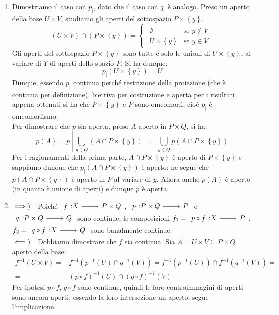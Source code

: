 \begin{demonstration}
\begin{enumerate}[label=\Roman*]
\begin{enumerate}[label=\alph*)]
\end{enumerate}
\item Dimostriamo il caso con $p_{\mid}$, dato che il caso con $q_{\mid}$ è analogo. Preso un aperto della base $U\times V$, studiamo gli aperti del sottospazio $P\times\left\{ y\right\}$.
\begin{equation*}
\left(U\times V\right)\cap \left(P\times\left\{ y\right\}\right)=\begin{cases}
	\begin{array}{ll}
		\emptyset & \text{se }y\notin V\\
		U\times\left\{y\right\} &\text{se }y\in V
	\end{array}
\end{cases}
\end{equation*}
Gli aperti del sottospazio $P\times\left\{ y\right\}$ sono tutte e solo le unioni di $U\times\left\{ y\right\}$, al variare di $Y$ di aperti dello spazio $P$. Si ha dunque:
\begin{equation*}
p_{\mid}\left(U\times \left\{y\right\}\right)=U
\end{equation*}
Dunque, essendo $p_{\mid}$ continua perché restrizione della proiezione (che è continua per definizione), biettiva per costruzione e aperta per i risultati appena ottenuti si ha che $P\times\left\{ y\right\}$ e $P$ sono omeomorfi, cioè $p_{\mid}$ è omeomorfismo.\\
Per dimostrare che $p$ sia aperta, preso $A$ aperto in $P\times Q$, si ha:
\begin{equation}
p\left(A\right)=p\left[\bigcup_{y\in Q}\left(A\cap P\times\left\{ y\right\}\right)\right]=\bigcup_{y\in Q}p\left(A\cap P\times\left\{ y\right\}\right)
\end{equation}
Per i ragionamenti della prima parte, $A\cap P\times\left\{ y\right\}$ è aperto di $P\times\left\{ y\right\}$ e sappiamo dunque che $p_{\mid}\left(A\cap P\times\left\{ y\right\}\right)$ è aperto: ne segue che $p\left(A\cap P\times\left\{ y\right\}\right)$ è aperto in $P$ al variare di $y$. Allora anche $p\left(A\right)$ è aperto (in quanto è unione di aperti) e dunque $p$ è aperta.
\item $\implies)\quad$Poiché $\funz{f}{X}{P\times Q}$, $\funz{p}{P\times Q}{P}$ e $\funz{q}{P\times Q}{Q}$ sono continue, le composizioni $f_1=\funz{p\circ f}{X}{P}$, $f_2=\funz{q\circ f}{X}{Q}$ sono banalmente continue.\\
$\impliedby)\quad$Dobbiamo dimostrare che $f$ sia continua. Sia $A=U\times V\subseteq P\times Q$ aperto della base:
\begin{align*}
f^{-1}\left(U\times V\right)=&f^{-1}\left(p^{-1}\left(U\right)\cap q^{-1}\left(V\right)\right)=f^{-1}\left(p^{-1}\left(U\right)\right)\cap f^{-1}\left(q^{-1}\left(V\right)\right)= \\
=& \left(p\circ f\right)^{-1}\left(U\right)\cap \left(q\circ f\right)^{-1}\left(V\right)
\end{align*}
Per ipotesi $p\circ f$, $q\circ f$ sono continue, quindi le loro controimmagini di aperti sono ancora aperti; essendo la loro intersezione un aperto, segue l'implicazione.
\end{enumerate}
\end{demonstration}
